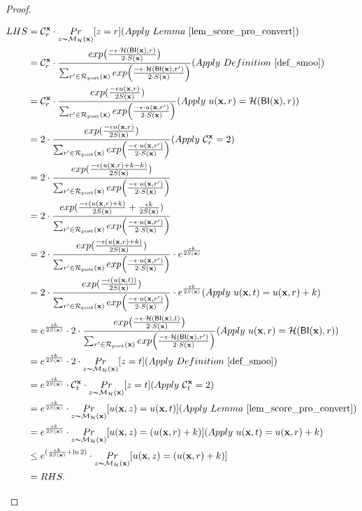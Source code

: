 \documentclass{article}
\begin{document}
\begin{proof}
\begin{itemize}
\begin{itemize}
      \begin{equation*}
      \begin{split}
      LHS 
      & = \cardinality{\dataobs}{r} \cdot \hexpmechPr{\dataobs}{z = r}     (Apply\ Lemma\ \ref{lem_score_pro_convert})\\
      & = \cardinality{\dataobs}{r} \cdot \frac {exp\big(\frac{-\epsilon\cdot\hellinger(\bysinfer(\dataobs),r)}{2\cdot S(\dataobs)}\big)}{\nomalizer{\dataobs}} 
      (Apply\ Definition\ \ref{def_smoo})\\
      & = \cardinality{\dataobs}{r} \cdot \frac{exp(\frac{-\epsilon \ux{r}}{2 S(\dataobs)})}{\unomalizer{\dataobs}}
      (Apply\ \ux{r} = \hellinger(\bysinfer(\dataobs), r))\\
      & = 2 \cdot \frac{exp(\frac{-\epsilon \ux{r}}{2 S(\dataobs)})}{\unomalizer{\dataobs}}                  (Apply\ \cardinality{\dataobs}{r} = 2)\\
      & = 2 \cdot \frac{exp(\frac{-\epsilon (\ux{r} + k - k)}{2 S(\dataobs)})}{\unomalizer{\dataobs}}\\
      & = 2 \cdot \frac{exp(\frac{-\epsilon (\ux{r} + k)}{2 S(\dataobs)} + \frac{\epsilon k}{2 S(\dataobs)})}{\unomalizer{\dataobs}}\\
      & = 2 \cdot \frac{exp(\frac{-\epsilon (\ux{r} + k)}{2 S(\dataobs)})}{\unomalizer{\dataobs}} \cdot e^{\frac{\epsilon k}{2 S(\dataobs)}}\\
      & = 2 \cdot \frac{exp(\frac{-\epsilon (\ux{t})}{2 S(\dataobs)})}{\unomalizer{\dataobs}} \cdot e^{\frac{\epsilon k}{2 S(\dataobs)}}  (Apply \ \ux{t} = \ux{r} + k)\\
      & = e^{\frac{\epsilon k}{2 S(\dataobs)}} \cdot 2 \cdot \frac {exp\big(\frac{-\epsilon\cdot\hellinger(\bysinfer(\dataobs), t)}{2\cdot S(\dataobs)}\big)}{\nomalizer{\dataobs}} 
      (Apply\ \ux{r} = \hellinger(\bysinfer(\dataobs), r))\\
      & = e^{\frac{\epsilon k}{2 S(\dataobs)}} \cdot 2 \cdot \hexpmechPr{\dataobs}{z = t}       (Apply\ Definition\ \ref{def_smoo})\\
      & = e^{\frac{\epsilon k}{2 S(\dataobs)}} \cdot \cardinality{\dataobs}{t} \cdot \hexpmechPr{\dataobs}{z = t}         (Apply \ \cardinality{\dataobs}{t} = 2)\\
      & = e^{\frac{\epsilon k}{2 S(\dataobs)}} \cdot \hexpmechPr{\dataobs}{\ux{z} = \ux{t}}               (Apply \ Lemma\ \ref{lem_score_pro_convert})\\
      & = e^{\frac{\epsilon k}{2 S(\dataobs)}} \cdot \hexpmechPr{\dataobs}{\ux{z} = (\ux{r} + k)}         (Apply \ \ux{t} = \ux{r} + k)\\
      & \leq e^{(\frac{\epsilon k}{2 S(\dataobs)} + \ln 2)} \cdot \hexpmechPr{\dataobs}{\ux{z} = (\ux{r} + k)}\\
      & = RHS.
      \end{split}
      \end{equation*}


\end{itemize}
\end{itemize}
\end{proof}
\end{document}
